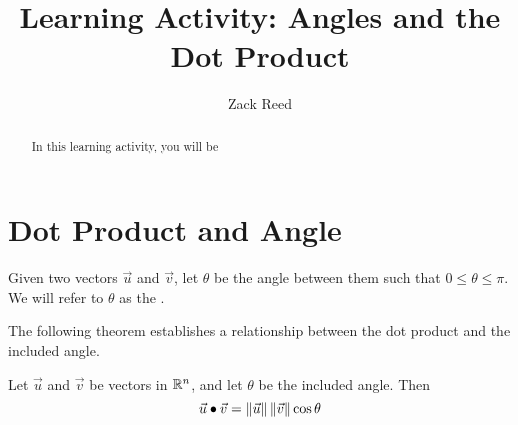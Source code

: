 \documentclass{ximera}
\author{Zack Reed}
\title{Learning Activity: Angles and the Dot Product}
\begin{document}
\begin{abstract}

    In this learning activity, you will be 
\end{abstract}
\maketitle

\section*{Dot Product and Angle}
 
Given two vectors $\vec{u}$ and $\vec{v}$, let $\theta$ be the angle between them such that $0\leq\theta\leq \pi$.  We will refer to $\theta$ as the .
 
\begin{center}
\end{center}
 
The following theorem establishes a relationship between the dot product and the included angle.
 
  \begin{theorem}\label{th:dotproductcosine} Let $\vec{u}$ and $\vec{v}$ be vectors in $\mathbb{R}^n$, and let $\theta$ be the included angle.  Then
  \begin{equation*} \label{matlintrans}
 \vec{u}\bullet\vec{v}=\left\|\vec{u}\right\|\left\|\vec{v}\right\|\cos \theta
\end{equation*}
\end{theorem}
 
\end{document}
